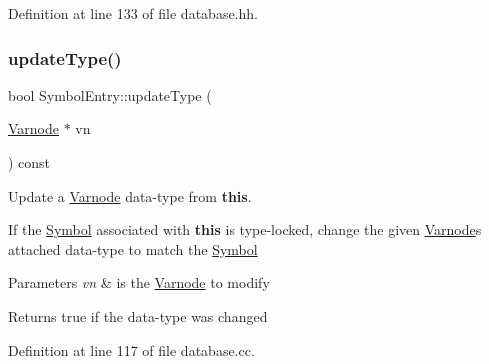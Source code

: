 Definition at line 133 of file database.\+hh.

\mbox{\label{class_symbol_entry_a9a4d4c566e91765896e49a4d565e077e}} 
\subsubsection{\texorpdfstring{updateType()}{updateType()}}
{\footnotesize\ttfamily bool Symbol\+Entry\+::update\+Type (\begin{DoxyParamCaption}\item[{\mbox{\hyperlink{class_varnode}{Varnode}} $\ast$}]{vn }\end{DoxyParamCaption}) const}



Update a \mbox{\hyperlink{class_varnode}{Varnode}} data-\/type from {\bfseries{this}}. 

If the \mbox{\hyperlink{class_symbol}{Symbol}} associated with {\bfseries{this}} is type-\/locked, change the given \mbox{\hyperlink{class_varnode}{Varnode}}\textquotesingle{}s attached data-\/type to match the \mbox{\hyperlink{class_symbol}{Symbol}} 
\begin{DoxyParams}{Parameters}
{\em vn} & is the \mbox{\hyperlink{class_varnode}{Varnode}} to modify \\
\hline
\end{DoxyParams}
\begin{DoxyReturn}{Returns}
true if the data-\/type was changed 
\end{DoxyReturn}


Definition at line 117 of file database.\+cc.

